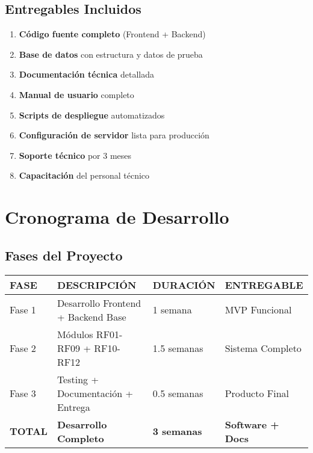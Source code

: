 \documentclass[12pt,a4paper]{article}
\begin{document}
\subsection{Entregables Incluidos}

\begin{enumerate}
    \item \textbf{Código fuente completo} (Frontend + Backend)
    \item \textbf{Base de datos} con estructura y datos de prueba
    \item \textbf{Documentación técnica} detallada
    \item \textbf{Manual de usuario} completo
    \item \textbf{Scripts de despliegue} automatizados
    \item \textbf{Configuración de servidor} lista para producción
    \item \textbf{Soporte técnico} por 3 meses
    \item \textbf{Capacitación} del personal técnico
\end{enumerate}

\section{Cronograma de Desarrollo}

\subsection{Fases del Proyecto}

\begin{longtable}{|p{2.8cm}|p{4.2cm}|p{2.5cm}|p{2.5cm}|}
\hline
\rowcolor{headerblue}
\textbf{\color{white}FASE} & \textbf{\color{white}DESCRIPCIÓN} & \textbf{\color{white}DURACIÓN} & \textbf{\color{white}ENTREGABLE} \\
\hline
\endhead

Fase 1 & Desarrollo Frontend + Backend Base & 1 semana & MVP Funcional \\
Fase 2 & Módulos RF01-RF09 + RF10-RF12 & 1.5 semanas & Sistema Completo \\
Fase 3 & Testing + Documentación + Entrega & 0.5 semanas & Producto Final \\
\hline
\rowcolor{lightgray}
\textbf{TOTAL} & \textbf{Desarrollo Completo} & \textbf{3 semanas} & \textbf{Software + Docs} \\
\hline
\end{longtable}
\end{document}
